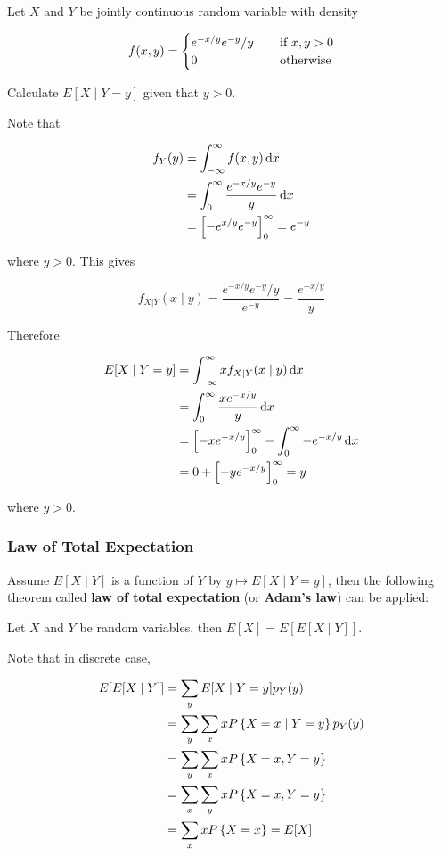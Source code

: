 \documentclass[a4paper,12pt]{article}
\begin{document}
\begin{exm}
  Let $X$ and $Y$ be jointly continuous random variable with density

  $$f(x,y)=\begin{cases}
    e^{-x/y}e^{-y}/y&\;\;\;\;\text{if }x,y>0\\
    0&\;\;\;\;\text{otherwise}
  \end{cases}$$\s

  Calculate $E[X\mid Y=y]$ given that $y>0$.\n
  
  \ans Note that

  $$\begin{aligned}[t]
    f_{Y}(y)&=\int_{-\infty}^{\infty}f(x,y)\,\mathrm{d} x\\
    &=\int_{0}^{\infty}\frac{e^{-x/y}e^{-y}}{y}\,\mathrm{d} x\\
    &=\left[ -e^{x/y}e^{-y}\right]_{0}^{\infty}=e^{-y}
  \end{aligned}$$\s

  where $y>0$. This gives

  $$f_{X|Y}(x\mid y)=\frac{e^{-x/y}e^{-y}/y}{e^{-y}}=\frac{e^{-x/y}}{y}$$\s

  Therefore

  $$\begin{aligned}[t]
    E[X\mid Y=y]&=\int_{-\infty}^{\infty}xf_{X|Y}(x\mid y)\,\mathrm{d} x\\
    &=\int_{0}^{\infty}\frac{xe^{-x/y}}{y}\,\mathrm{d} x\\
    &=\left[ -xe^{-x/y}\right]_{0}^{\infty}-\int_{0}^{\infty}-e^{-x/y}\,\mathrm{d} x\\
    &=0+\left[ -ye^{-x/y}\right]_{0}^{\infty}=y
  \end{aligned}$$\s

  where $y>0$.
\end{exm}\n

\subsubsection{Law of Total Expectation}
Assume $E[X\mid Y]$ is a function of $Y$ by $y\mapsto E[X\mid Y=y]$, then the following theorem called \textbf{law of total expectation} (or \textbf{Adam's law}) can be applied:\n

\begin{thm}
  Let $X$ and $Y$ be random variables, then $E[X]=E[E[X\mid Y]]$.\n

  \prf Note that in discrete case,

  $$\begin{aligned}[t]
    E[E[X\mid Y]]&=\sum_{y}E[X\mid Y=y]p_{Y}(y)\\
    &=\sum_{y}\sum_{x}xP\left\{ X=x\mid Y=y\right\}p_{Y}(y)\\
    &=\sum_{y}\sum_{x}xP\left\{ X=x,Y=y\right\}\\
    &=\sum_{x}\sum_{y}xP\left\{ X=x,Y=y\right\}\\
    &=\sum_{x}xP\left\{ X=x\right\}=E[X]
  \end{aligned}$$
\end{thm}\n
\end{document}
